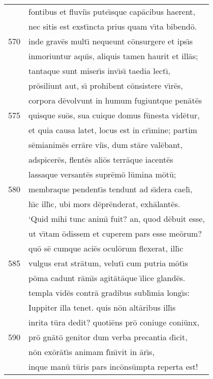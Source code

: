 \documentclass[paper=6in:9in,pagesize=pdftex,
               headinclude=on,footinclude=on,12pt]{scrbook}
\begin{document}
\begin{longtable}[p]{ r l }
 & fontibus et fluvi\={\i}s pute\={\i}sque cap\=acibus haerent,\\ 
 & nec sitis est exst\={\i}ncta prius quam v\={\i}ta bibend\=o.\\ 
570 & inde grav\=es mult\={\i} nequeunt c\=onsurgere et ips\={\i}s\\ 
 & inmoriuntur aqu\={\i}s, aliquis tamen haurit et ill\=as;\\ 
 & tantaque sunt miser\={\i}s inv\={\i}s\={\i} taedia lect\={\i},\\ 
 & pr\=osiliunt aut, s\={\i} prohibent c\=onsistere v\={\i}r\=es,\\ 
 & corpora d\=evolvunt in humum fugiuntque pen\=at\=es\\ 
575 & quisque su\=os, sua cuique domus f\=unesta vid\=etur,\\ 
 & et quia causa latet, locus est in cr\={\i}mine; partim\\ 
 & s\=emianim\=es err\=are vi\={\i}s, dum st\=are val\=ebant,\\ 
 & adspicer\=es, flent\=es ali\=os terr\=aque iacent\=es\\ 
 & lassaque versant\=es supr\=em\=o l\=umina m\=ot\=u;\\ 
580 & membraque pendent\={\i}s tendunt ad s\={\i}dera cael\={\i},\\ 
 & h\={\i}c ill\={\i}c, ubi mors d\=epr\=enderat, exh\=alant\=es.\\ 
 & \indent `Quid mihi tunc anim\={\i} fuit? an, quod d\=ebuit esse,\\ 
 & ut v\={\i}tam \=odissem et cuperem pars esse me\=orum?\\ 
 & qu\=o s\=e cumque aci\=es ocul\=orum flexerat, ill\={\i}c\\ 
585 & vulgus erat str\=atum, velut\={\i} cum putria m\=ot\={\i}s\\ 
 & p\=oma cadunt r\=am\={\i}s agit\=at\=aque \={\i}lice gland\=es.\\ 
 & templa vid\=es contr\=a gradibus subl\={\i}mia long\={\i}s:\\ 
 & Iuppiter illa tenet. quis n\=on alt\=aribus ill\={\i}s\\ 
 & inrita t\=ura dedit? quoti\=ens pr\=o coniuge coni\=unx,\\ 
590 & pr\=o gn\=at\=o genitor dum verba precantia d\={\i}cit,\\ 
 & n\=on ex\=or\=at\={\i}s animam f\={\i}n\={\i}vit in \=ar\={\i}s,\\ 
 & inque man\=u t\=uris pars inc\=ons\=umpta reperta est!\\ 

\end{longtable}
\end{document}
